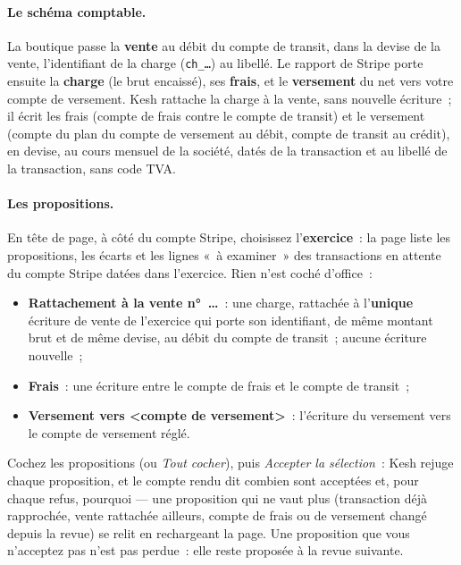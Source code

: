 \documentclass[a4paper,11pt,oneside]{article}
\begin{document}
\paragraph{Le schéma comptable.} La boutique passe la \textbf{vente} au débit du compte de transit, dans la devise de la vente, l'identifiant de la charge (\texttt{ch\_\dots}) au libellé. Le rapport de Stripe porte ensuite la \textbf{charge} (le brut encaissé), ses \textbf{frais}, et le \textbf{versement} du net vers votre compte de versement. Kesh rattache la charge à la vente, sans nouvelle écriture~; il écrit les frais (compte de frais contre le compte de transit) et le versement (compte du plan du compte de versement au débit, compte de transit au crédit), en devise, au cours mensuel de la société, datés de la transaction et au libellé de la transaction, sans code TVA.

\paragraph{Les propositions.} En tête de page, à côté du compte Stripe, choisissez l'\textbf{exercice}~: la page liste les propositions, les écarts et les lignes «~à examiner~» des transactions en attente du compte Stripe datées dans l'exercice. Rien n'est coché d'office~:
\begin{itemize}
    \item \textbf{Rattachement à la vente n°~\dots}~: une charge, rattachée à l'\textbf{unique} écriture de vente de l'exercice qui porte son identifiant, de même montant brut et de même devise, au débit du compte de transit~; aucune écriture nouvelle~;
    \item \textbf{Frais}~: une écriture entre le compte de frais et le compte de transit~;
    \item \textbf{Versement vers <compte de versement>}~: l'écriture du versement vers le compte de versement réglé.
\end{itemize}
Cochez les propositions (ou \emph{Tout cocher}), puis \emph{Accepter la sélection}~: Kesh rejuge chaque proposition, et le compte rendu dit combien sont acceptées et, pour chaque refus, pourquoi --- une proposition qui ne vaut plus (transaction déjà rapprochée, vente rattachée ailleurs, compte de frais ou de versement changé depuis la revue) se relit en rechargeant la page. Une proposition que vous n'acceptez pas n'est pas perdue~: elle reste proposée à la revue suivante.
\end{document}
